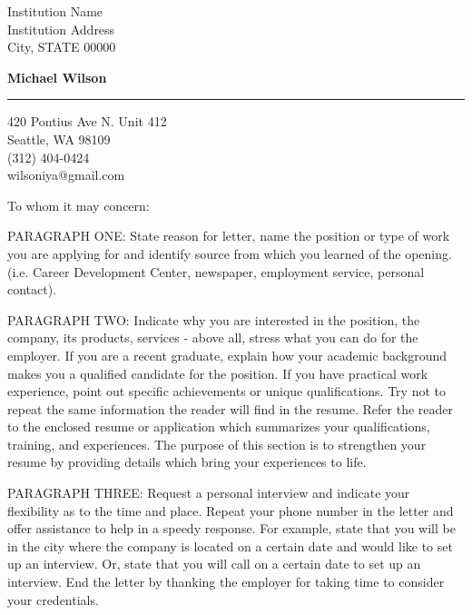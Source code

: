 \documentclass{letter} %
\begin{document}
\longindentation=0pt                       %
\let\raggedleft\raggedright                %

\begin{letter}{
    Institution Name \\
    Institution Address \\
    City, STATE 00000
}

\vspace*{-4\baselineskip}

\begin{center}
{\large\bf Michael Wilson}
\end{center}
\medskip\hrule height 1pt
\begin{center} {
    420 Pontius Ave N. Unit 412 \\
    Seattle, WA 98109 \\
    (312) 404-0424 \\
    wilsoniya@gmail.com
}
\end{center}


\opening{To whom it may concern:}

\noindent PARAGRAPH ONE: State reason for letter, name the position or type
of work you are applying for and identify source from  which  you
learned   of   the  opening.  (i.e.  Career  Development  Center,
newspaper, employment service, personal contact).

\noindent PARAGRAPH  TWO:  Indicate why you are interested in the position, the
company, its products, services - above all, stress what  you can  do  for  the
employer. If you are a recent graduate, explain how your academic background
makes you a qualified candidate  for the  position.  If  you have practical
work experience, point out specific achievements or unique qualifications. Try
not to repeat the  same  information  the reader will find in the resume. Refer
the reader to the enclosed resume or application which summarizes your
qualifications,  training,  and experiences. The purpose of this section is to
strengthen your resume  by  providing  details which bring your experiences to
life.

\noindent PARAGRAPH THREE: Request a personal interview and  indicate  your
flexibility as to the time and place. Repeat your phone number in the letter
and offer assistance to help in a speedy response. For example,  state that you
will be in the city where the company is located on a certain date and would
like to set up an  interview.  Or,  state  that  you  will  call  on a certain
date to set up an interview. End the letter by thanking  the  employer  for
taking time to consider your credentials.



\end{letter}
\end{document}
